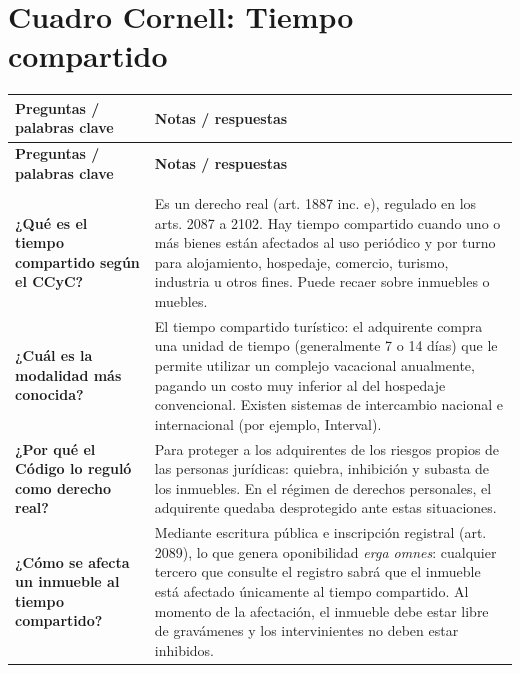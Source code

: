 \documentclass[12pt,oneside]{book}
\begin{document}
\section{Cuadro Cornell: Tiempo compartido}

\begin{longtable}{
    >{\raggedright\arraybackslash}p{}
    >{\raggedright\arraybackslash}p{}
}
\toprule
\textbf{Preguntas / palabras clave} & \textbf{Notas / respuestas} \\
\midrule
\endfirsthead
\toprule
\textbf{Preguntas / palabras clave} & \textbf{Notas / respuestas} \\
\midrule
\endhead
\midrule
\multicolumn{2}{r}{\small\textit{continúa en la página siguiente}} \\
\endfoot
\bottomrule
\endlastfoot

\textbf{¿Qué es el tiempo compartido según el CCyC?} &
Es un derecho real (art. 1887 inc. e), regulado en los arts. 2087 a 2102. Hay tiempo compartido cuando uno o más bienes están afectados al uso periódico y por turno para alojamiento, hospedaje, comercio, turismo, industria u otros fines. Puede recaer sobre inmuebles o muebles. \\[0.8em]

\textbf{¿Cuál es la modalidad más conocida?} &
El tiempo compartido turístico: el adquirente compra una unidad de tiempo (generalmente 7 o 14 días) que le permite utilizar un complejo vacacional anualmente, pagando un costo muy inferior al del hospedaje convencional. Existen sistemas de intercambio nacional e internacional (por ejemplo, Interval). \\[0.8em]

\textbf{¿Por qué el Código lo reguló como derecho real?} &
Para proteger a los adquirentes de los riesgos propios de las personas jurídicas: quiebra, inhibición y subasta de los inmuebles. En el régimen de derechos personales, el adquirente quedaba desprotegido ante estas situaciones. \\[0.8em]

\textbf{¿Cómo se afecta un inmueble al tiempo compartido?} &
Mediante escritura pública e inscripción registral (art. 2089), lo que genera oponibilidad \textit{erga omnes}: cualquier tercero que consulte el registro sabrá que el inmueble está afectado únicamente al tiempo compartido. Al momento de la afectación, el inmueble debe estar libre de gravámenes y los intervinientes no deben estar inhibidos. \\[0.8em]


\end{longtable}
\end{document}
